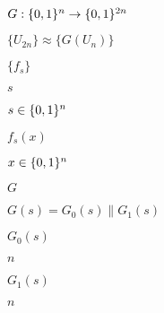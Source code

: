\documentclass[10pt]{book}
\begin{document}
\begin{mdSnippets}
\begin{mdInlineSnippet}%
$G: \{0,1\}^n \to \{0,1\}^{2n}$\end{mdInlineSnippet}%
\begin{mdInlineSnippet}[1d669012dda7508e29ed07248e64ec6b]%
$\{ U_{2n} \} \approx \{ G(U_n)\}$\end{mdInlineSnippet}%
\begin{mdInlineSnippet}[f0a0745b39ca7c74b201f7784e766521]%
$\{f_s\}$\end{mdInlineSnippet}%
\begin{mdInlineSnippet}[03c7c0ace395d80182db07ae2c30f034]%
$s$\end{mdInlineSnippet}%
\begin{mdInlineSnippet}%
$s \in \{0,1\}^n$\end{mdInlineSnippet}%
\begin{mdInlineSnippet}%
$f_s(x)$\end{mdInlineSnippet}%
\begin{mdInlineSnippet}[cc927a52f8d88c7f8d09d1be36733f68]%
$x \in \{0,1\}^n$\end{mdInlineSnippet}%
\begin{mdInlineSnippet}[dfcf28d0734569a6a693bc8194de62bf]%
$G$\end{mdInlineSnippet}%
\begin{mdInlineSnippet}%
$G(s) = G_0(s) \| G_1(s)$\end{mdInlineSnippet}%
\begin{mdInlineSnippet}[73ee0e351cc07da7eb63177bf67ace7a]%
$G_0(s)$\end{mdInlineSnippet}%
\begin{mdInlineSnippet}[7b8b965ad4bca0e41ab51de7b31363a1]%
$n$\end{mdInlineSnippet}%
\begin{mdInlineSnippet}[c1eb3673de8bab032b3715a1978ef434]%
$G_1(s)$\end{mdInlineSnippet}%
\begin{mdInlineSnippet}[7b8b965ad4bca0e41ab51de7b31363a1]%
$n$\end{mdInlineSnippet}%

\end{mdSnippets}
\end{document}
